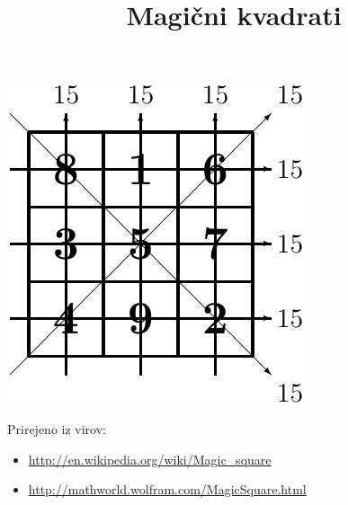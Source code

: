 \documentclass[a4paper,12pt]{article}
\title{Magični kvadrati}\date{}\author{}
\begin{document}
\maketitle
\begin{center}
   \includegraphics{slika.pdf}
\end{center}

Prirejeno iz virov:

\begin{itemize}
   \item \url{http://en.wikipedia.org/wiki/Magic_square}
   \item \url{http://mathworld.wolfram.com/MagicSquare.html}
\end{itemize}

\tableofcontents


\end{document}
